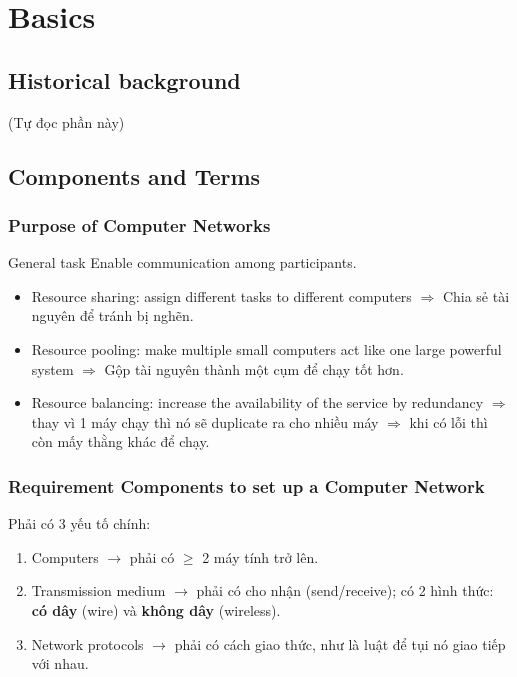 \chapter{Basics}
\chapterminitoc

\section{Historical background}

(Tự đọc phần này)
\medskip

\section{Components and Terms}

\subsection{Purpose of Computer Networks}

\begin{mybox}{General task}
Enable communication among participants.
\end{mybox}

\begin{itemize}
  \item Resource sharing: assign different tasks to different computers $\Rightarrow$ Chia sẻ tài nguyên để tránh bị nghẽn.
  \item Resource pooling: make multiple small computers act like one large powerful system $\Rightarrow$ Gộp tài nguyên thành một cụm để chạy tốt hơn.
  \item Resource balancing: increase the availability of the service by redundancy $\Rightarrow$ thay vì 1 máy chạy thì nó sẽ duplicate ra cho nhiều máy $\Rightarrow$ khi có lỗi thì còn mấy thằng khác để chạy.
\end{itemize}
\medskip

\subsection{Requirement Components to set up a Computer Network}

Phải có 3 yếu tố chính:

\begin{enumerate}
  \item Computers $\rightarrow$ phải có $\geq$ 2 máy tính trở lên.
  \item Transmission medium $\rightarrow$ phải có cho nhận (send/receive); có 2 hình thức: \textbf{có dây} (wire) và \textbf{không dây} (wireless).
  \item Network protocols $\rightarrow$ phải có cách giao thức, như là luật để tụi nó giao tiếp với nhau.
\end{enumerate}


